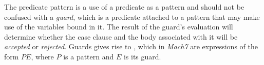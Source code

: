 

The predicate pattern is a use of a predicate as a pattern and should not be 
confused with a \emph{guard}, which is a predicate attached to a pattern that 
may make use of the variables bound in it. The result of the guard's evaluation will 
determine whether the case clause and the body associated with it will be 
\emph{accepted} or \emph{rejected}. Guards gives rise to , which in \emph{Mach7} are expressions of the form $P$\code{|=}$E$, where $P$ is a 
pattern and $E$ is its guard.

